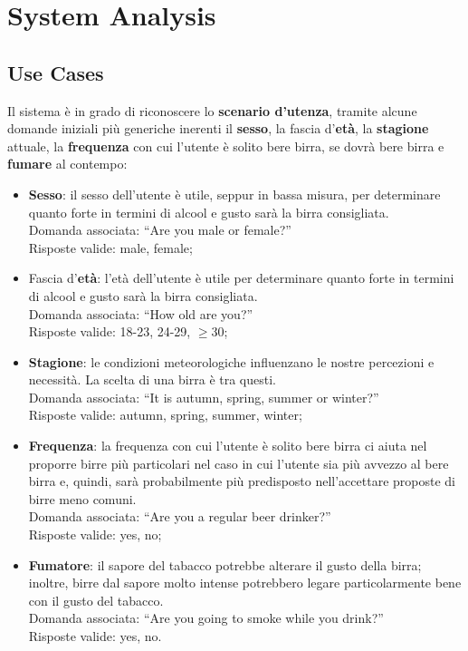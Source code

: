 \documentclass[12pt]{article}
\begin{document}
\section{System Analysis}

\subsection{Use Cases}
Il sistema è in grado di riconoscere lo \textbf{scenario d’utenza}, tramite alcune domande iniziali più generiche inerenti il \textbf{sesso}, la fascia d’\textbf{età}, la \textbf{stagione} attuale, la \textbf{frequenza} con cui l’utente è solito bere birra, se dovrà bere birra e \textbf{fumare} al contempo:
\begin{itemize}
\item \textbf{Sesso}: il sesso dell’utente è utile, seppur in bassa misura, per determinare quanto forte in termini di alcool e gusto sarà la birra consigliata. \\Domanda associata: “Are you male or female?” \\Risposte valide: male, female;

	\item Fascia d’\textbf{età}: l’età dell’utente è utile per determinare quanto forte in termini di alcool e gusto sarà la birra consigliata. \\Domanda associata: “How old are you?” \\Risposte valide: 18-23, 24-29, $\geq30$;

\item \textbf{Stagione}: le condizioni meteorologiche influenzano le nostre percezioni e necessità. La scelta di una birra è tra questi. \\Domanda associata: “It is autumn, spring, summer or winter?” \\Risposte valide: autumn, spring, summer, winter;

\item \textbf{Frequenza}: la frequenza con cui l’utente è solito bere birra ci aiuta nel proporre birre più particolari nel caso in cui l’utente sia più avvezzo al bere birra e, quindi, sarà probabilmente più predisposto nell’accettare proposte di birre meno comuni. \\Domanda associata: “Are you a regular beer drinker?” \\Risposte valide: yes, no;

\item \textbf{Fumatore}: il sapore del tabacco potrebbe alterare il gusto della birra; inoltre, birre dal sapore molto intense potrebbero legare particolarmente bene con il gusto del tabacco. \\Domanda associata: “Are you going to smoke while you drink?” \\Risposte valide: yes, no.
\end{itemize}
\end{document}
